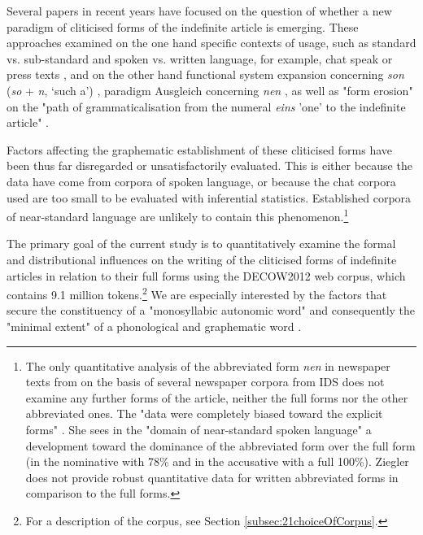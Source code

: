 Several papers in recent years have focused on the question of whether a new paradigm of cliticised forms of the indefinite article is emerging. 
These approaches examined on the one hand specific contexts of usage, such as standard vs. sub-standard \citep{Volmert1995,Schiering2002,Ziegler2011} and spoken vs. written language, for example, chat speak or press texts \citep{Tophinke2002,Burri2003,Vogel2006,Ziegler2012}, and on the other hand functional system expansion concerning \textit{son} (\textit{so} + \textit{n}, `such a') \citep{HoleKlumpp2000,LenerzLohnstein2005,Eroms2008,Heusinger2012}, paradigm Ausgleich concerning \textit{nen} \citep{Vogel2006}, as well as "form erosion" on the "path of grammaticalisation from the numeral \textit{eins} 'one' to the indefinite article" \citep[79]{Szczepaniak2009}.

Factors affecting the graphematic establishment of these cliticised forms have been thus far disregarded or unsatisfactorily evaluated. 
This is either because the data have come from corpora of spoken language, or because the chat corpora used are too small to be evaluated with inferential statistics. Established corpora of near-standard language are unlikely to contain this phenomenon.\footnote{
	The only quantitative analysis of the abbreviated form \textit{nen} in newspaper texts from \citet{Ziegler2012} on the basis of several newspaper corpora from IDS \citep{KupietzKeibel2009} does not examine any further forms of the article, neither the full forms nor the other abbreviated ones. 
	The "data were completely biased toward the explicit forms" \citep[301]{Ziegler2012}. 
	She sees in the "domain of near-standard spoken language" a development toward the dominance of the abbreviated form over the full form (in the nominative with 78\% and in the accusative with a full 100\%). 
	Ziegler does not provide robust quantitative data for written abbreviated forms in comparison to the full forms.}

The primary goal of the current study is to quantitatively examine the formal and distributional influences on the writing of the cliticised forms of indefinite articles in relation to their full forms using the DECOW2012 web corpus, which contains 9.1 million tokens.\footnote{
	For a description of the corpus, see Section \ref{subsec:21choiceOfCorpus}.}
We are especially interested by the factors that secure the constituency of a "monosyllabic autonomic word" \citep[188]{Vogel2006} and consequently the "minimal extent" of a phonological and graphematic word \citep{Jacobs2005,Fuhrhop2008}.

